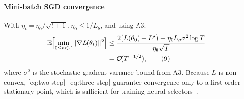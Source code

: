 \documentclass[journal]{IEEEtran}
\begin{document}
    \paragraph{Mini-batch SGD convergence}
    With $\eta_{t}=\eta_{0}/\sqrt{t+1}$, $\eta_{0}\le 1/L_{g}$, and using A3:
    \begin{align*}
        \mathbb{E}\Bigl[\min_{0\le t<T}\|\nabla L(\theta_{t})\|^{2}\Bigr] & \le \frac{2\bigl(L(\theta_{0})-L^{\star}\bigr)+\eta_{0}L_{g}\sigma^{2}\log T}{\eta_{0}\sqrt{T}} \\
                                                                          & = \mathcal{O}\!\bigl(T^{-1/2}\bigr), \tag{9}\label{eq:three-step}
    \end{align*}
    where $\sigma^{2}$ is the stochastic-gradient variance bound from A3.
    Because $L$ is non-convex, \eqref{eq:two-step}--\eqref{eq:three-step}
    guarantee convergence only to a first-order stationary point, which is sufficient
    for training neural selectors~\cite{ghadimi2013stochastic}.
\end{document}
